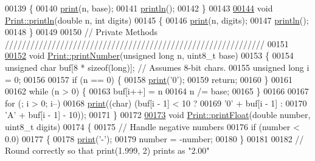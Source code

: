 \begin{DoxyCode}
00139 \{
00140   \hyperlink{class_print_aa7b0a6dc63e3d27effd8459e3d443b83}{print}(n, base);
00141   \hyperlink{class_print_a525b37c566658ff8113a067f6e8d5bf1}{println}();
00142 \}
00143 
\hypertarget{_print_8cpp_source_l00144}{}\hyperlink{class_print_a4302b58946b9355b0491118227beed07}{00144} \textcolor{keywordtype}{void} \hyperlink{class_print_a525b37c566658ff8113a067f6e8d5bf1}{Print::println}(\textcolor{keywordtype}{double} n, \textcolor{keywordtype}{int} digits)
00145 \{
00146   \hyperlink{class_print_aa7b0a6dc63e3d27effd8459e3d443b83}{print}(n, digits);
00147   \hyperlink{class_print_a525b37c566658ff8113a067f6e8d5bf1}{println}();
00148 \}
00149 
00150 \textcolor{comment}{// Private Methods /////////////////////////////////////////////////////////////}
00151 
\hypertarget{_print_8cpp_source_l00152}{}\hyperlink{class_print_ae6dc349a48650e771a4443e93bfa9c65}{00152} \textcolor{keywordtype}{void} \hyperlink{class_print_ae6dc349a48650e771a4443e93bfa9c65}{Print::printNumber}(\textcolor{keywordtype}{unsigned} \textcolor{keywordtype}{long} n, uint8\_t base)
00153 \{
00154   \textcolor{keywordtype}{unsigned} \textcolor{keywordtype}{char} buf[8 * \textcolor{keyword}{sizeof}(long)]; \textcolor{comment}{// Assumes 8-bit chars. }
00155   \textcolor{keywordtype}{unsigned} \textcolor{keywordtype}{long} i = 0;
00156 
00157   \textcolor{keywordflow}{if} (n == 0) \{
00158     \hyperlink{class_print_aa7b0a6dc63e3d27effd8459e3d443b83}{print}(\textcolor{charliteral}{'0'});
00159     \textcolor{keywordflow}{return};
00160   \} 
00161 
00162   \textcolor{keywordflow}{while} (n > 0) \{
00163     buf[i++] = n %
00164     n /= base;
00165   \}
00166 
00167   \textcolor{keywordflow}{for} (; i > 0; i--)
00168     \hyperlink{class_print_aa7b0a6dc63e3d27effd8459e3d443b83}{print}((\textcolor{keywordtype}{char}) (buf[i - 1] < 10 ?
00169       \textcolor{charliteral}{'0'} + buf[i - 1] :
00170       \textcolor{charliteral}{'A'} + buf[i - 1] - 10));
00171 \}
00172 
\hypertarget{_print_8cpp_source_l00173}{}\hyperlink{class_print_afd7abd9d94aa5210d2d0f97e614e4625}{00173} \textcolor{keywordtype}{void} \hyperlink{class_print_afd7abd9d94aa5210d2d0f97e614e4625}{Print::printFloat}(\textcolor{keywordtype}{double} number, uint8\_t digits) 
00174 \{ 
00175   \textcolor{comment}{// Handle negative numbers}
00176   \textcolor{keywordflow}{if} (number < 0.0)
00177   \{
00178      \hyperlink{class_print_aa7b0a6dc63e3d27effd8459e3d443b83}{print}(\textcolor{charliteral}{'-'});
00179      number = -number;
00180   \}
00181 
00182   \textcolor{comment}{// Round correctly so that print(1.999, 2) prints as "2.00"}

\end{DoxyCode}

